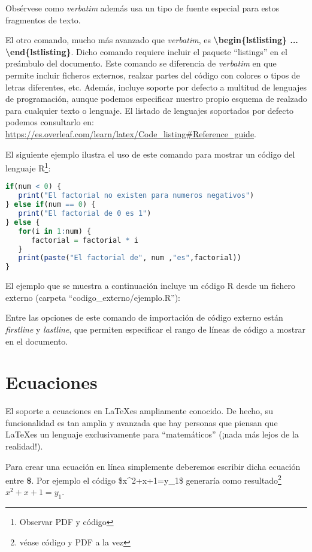 Obsérvese como \emph{verbatim} además usa un tipo de fuente especial para estos fragmentos de texto.

El otro comando, mucho más avanzado que \emph{verbatim}, es \textbf{\textbackslash begin\{lstlisting\} ... \textbackslash end\{lstlisting\}}. Dicho comando requiere incluir el paquete ``listings'' en el preámbulo del documento. Este comando se diferencia de \emph{verbatim} en que permite incluir ficheros externos, realzar partes del código con colores o tipos de letras diferentes, etc. Además, incluye soporte por defecto a multitud de lenguajes de programación, aunque podemos especificar nuestro propio esquema de realzado para cualquier texto o lenguaje. El listado de lenguajes soportados por defecto podemos consultarlo en: \url{https://es.overleaf.com/learn/latex/Code_listing#Reference_guide}.

El siguiente ejemplo ilustra el uso de este comando para mostrar un código del lenguaje R\footnote{Observar PDF y código}:

\begin{lstlisting}[language=R]
if(num < 0) {
   print("El factorial no existen para numeros negativos")
} else if(num == 0) {
   print("El factorial de 0 es 1")
} else {
   for(i in 1:num) {
      factorial = factorial * i
   }
   print(paste("El factorial de", num ,"es",factorial))
}
\end{lstlisting}

El ejemplo que se muestra a continuación incluye un código R desde un fichero externo (carpeta ``codigo\_externo/ejemplo.R''):



Entre las opciones de este comando de importación de código externo están \emph{firstline} y \emph{lastline}, que permiten especificar el rango de líneas de código a mostrar en el documento.
	
\section{Ecuaciones}

El soporte a ecuaciones en \LaTeX es ampliamente conocido. De hecho, su funcionalidad es tan amplia y avanzada que hay personas que piensan que \LaTeX es un lenguaje exclusivamente para ``matemáticos'' (¡nada más lejos de la realidad!).

Para crear una ecuación en línea simplemente deberemos escribir dicha ecuación entre \textbf{\$}. Por ejemplo el código \$x\^{}2+x+1=y\_1\$ generaría como resultado\footnote{véase código y PDF a la vez} $x^2+x+1=y_1$.

